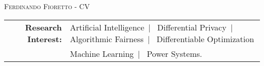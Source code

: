\documentclass[localFont,alternative]{documentMETADATA}
\begin{document}
\makecvheader\sloppy\allowdisplaybreaks

	\makecvfooter
		{\textsc{}} %
		{\textsc{Ferdinando Fioretto - CV}}
		{\thepage}


	\begin{tabular}{r l} 
	{\bf Research Interest:} &
	{Artificial Intelligence}~|~
	{Differential Privacy}~|~
	{Algorithmic Fairness}~|~
	{Differentiable Optimization}\\
	&{Machine Learning}~|~
	{Power Systems}.
	\end{tabular}



		 
	
	  
	
	 
	          
	
	
\end{document}
